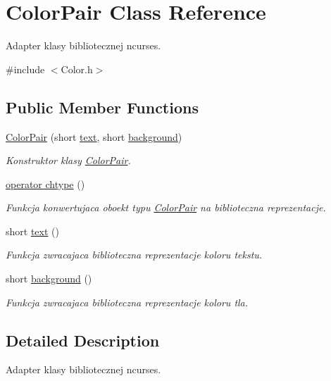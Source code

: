 \hypertarget{class_color_pair}{}\section{Color\+Pair Class Reference}
\label{class_color_pair}


Adapter klasy bibliotecznej ncurses.  




{\ttfamily \#include $<$Color.\+h$>$}

\subsection*{Public Member Functions}
\begin{DoxyCompactItemize}
\item 
\hyperlink{class_color_pair_a7df2f6130db43995c6be152393ab5154}{Color\+Pair} (short \hyperlink{class_color_pair_aea1cad9443dc9af5c21cc2eff02d25fa}{text}, short \hyperlink{class_color_pair_ada47f2ba6bd0ebaabe969f279a9e24a7}{background})
\begin{DoxyCompactList}\small\item\em Konstruktor klasy \hyperlink{class_color_pair}{Color\+Pair}. \end{DoxyCompactList}\item 
\hyperlink{class_color_pair_ad03b4dde3935995da2b8f79867230502}{operator chtype} ()
\begin{DoxyCompactList}\small\item\em Funkcja konwertujaca oboekt typu \hyperlink{class_color_pair}{Color\+Pair} na biblioteczna reprezentacje. \end{DoxyCompactList}\item 
short \hyperlink{class_color_pair_aea1cad9443dc9af5c21cc2eff02d25fa}{text} ()
\begin{DoxyCompactList}\small\item\em Funkcja zwracajaca biblioteczna reprezentacje koloru tekstu. \end{DoxyCompactList}\item 
short \hyperlink{class_color_pair_ada47f2ba6bd0ebaabe969f279a9e24a7}{background} ()
\begin{DoxyCompactList}\small\item\em Funkcja zwracajaca biblioteczna reprezentacje koloru tla. \end{DoxyCompactList}\end{DoxyCompactItemize}


\subsection{Detailed Description}
Adapter klasy bibliotecznej ncurses. 

